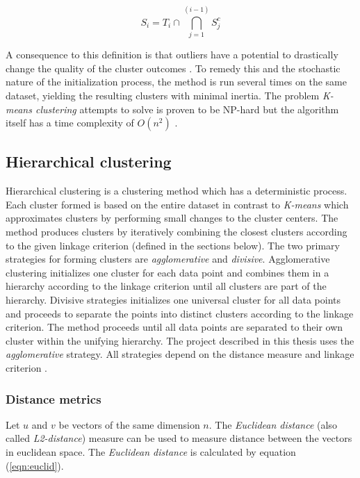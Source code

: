 \begin{equation}
\label{eqn:Si}
S_i = T_i \cap \bigcap_{j=1}^{(i-1)} S_j^c
\end{equation}

A consequence to this definition is that outliers have a potential to drastically change the quality of the cluster outcomes \cite{chawla2013k}. To remedy this and the stochastic nature of the initialization process, the method is run several times on the same dataset, yielding the resulting clusters with minimal inertia. The problem \textit{K-means clustering} attempts to solve is proven to be NP-hard \cite{chawla2013k, mahajan2009planar} but the algorithm itself has a time complexity of $O(n^2)$ \cite{pakhira2014linear}.


\subsection{Hierarchical clustering}

Hierarchical clustering is a clustering method which has a deterministic process. Each cluster formed is based on the entire dataset in contrast to \textit{K-means} which approximates clusters by performing small changes to the cluster centers. The method produces clusters by iteratively combining the closest clusters according to the given linkage criterion (defined in the sections below). The two primary strategies for forming clusters are \textit{agglomerative} and \textit{divisive}. Agglomerative clustering initializes one cluster for each data point and combines them in a hierarchy according to the linkage criterion until all clusters are part of the hierarchy. Divisive strategies initializes one universal cluster for all data points and proceeds to separate the points into distinct clusters according to the linkage criterion. The method proceeds until all data points are separated to their own cluster within the unifying hierarchy. The project described in this thesis uses the \textit{agglomerative} strategy. All strategies depend on the distance measure and linkage criterion \cite{murtagh1983survey}.

\subsubsection{Distance metrics}
Let $u$ and $v$ be vectors of the same dimension $n$. The \textit{Euclidean distance} (also called \textit{L2-distance}) measure can be used to measure distance between the vectors in euclidean space. The \textit{Euclidean distance} is calculated by equation (\ref{eqn:euclid}).

